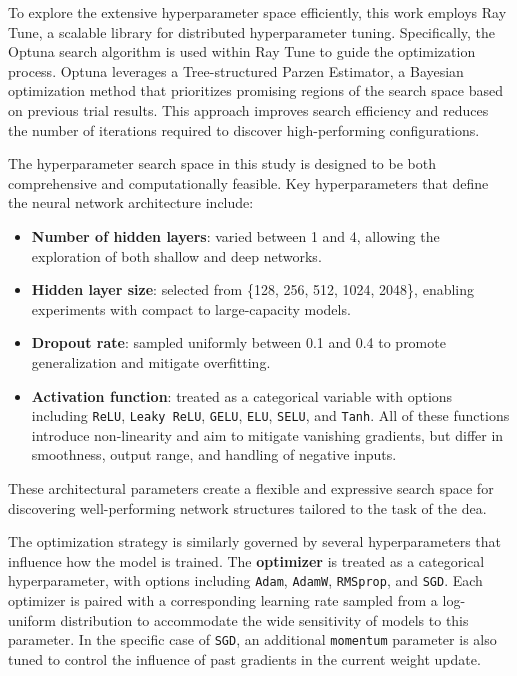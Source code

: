 To explore the extensive hyperparameter space efficiently, this work employs Ray Tune, a scalable library for distributed hyperparameter tuning.
Specifically, the Optuna search algorithm is used within Ray Tune to guide the optimization process.
Optuna leverages a Tree-structured Parzen Estimator, a Bayesian optimization method that prioritizes promising regions of the search space based on previous trial results.
This approach improves search efficiency and reduces the number of iterations required to discover high-performing configurations.

The hyperparameter search space in this study is designed to be both comprehensive and computationally feasible.
Key hyperparameters that define the neural network architecture include:

\begin{itemize}
    \item \textbf{Number of hidden layers}: varied between 1 and 4, allowing the exploration of both shallow and deep networks.
    \item \textbf{Hidden layer size}: selected from \{128, 256, 512, 1024, 2048\}, enabling experiments with compact to large-capacity models.
    \item \textbf{Dropout rate}: sampled uniformly between 0.1 and 0.4 to promote generalization and mitigate overfitting.
    \item \textbf{Activation function}: treated as a categorical variable with options including \texttt{ReLU}, \texttt{Leaky ReLU}, \texttt{GELU}, \texttt{ELU}, \texttt{SELU}, and \texttt{Tanh}.
    All of these functions introduce non-linearity and aim to mitigate vanishing gradients, but differ in smoothness, output range, and handling of negative inputs.
\end{itemize}

These architectural parameters create a flexible and expressive search space for discovering well-performing network structures tailored to the task of the \ac{dea}.

The optimization strategy is similarly governed by several hyperparameters that influence how the model is trained.
The \textbf{optimizer} is treated as a categorical hyperparameter, with options including \texttt{Adam}, \texttt{AdamW}, \texttt{RMSprop}, and \texttt{SGD}.
Each optimizer is paired with a corresponding learning rate sampled from a log-uniform distribution to accommodate the wide sensitivity of models to this parameter.
In the specific case of \texttt{SGD}, an additional \texttt{momentum} parameter is also tuned to control the influence of past gradients in the current weight update.

